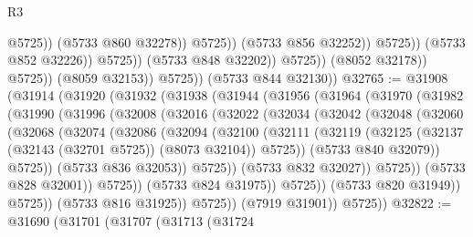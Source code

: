 \begin{lexlean}{R3}
\begin{coremodule}
                                              @5725))
                                          (@5733 @860 @32278))
                                        @5725))
                                    (@5733 @856 @32252))
                                  @5725))
                              (@5733 @852 @32226))
                            @5725))
                        (@5733 @848 @32202))
                      @5725))
                  (@8052 @32178))
                @5725))
            (@8059 @32153))
          @5725))
      (@5733 @844 @32130))
@32765 := @31908
    (@31914
      (@31920
        (@31932
          (@31938
            (@31944
              (@31956
                (@31964
                  (@31970
                    (@31982
                      (@31990
                        (@31996
                          (@32008
                            (@32016
                              (@32022
                                (@32034
                                  (@32042
                                    (@32048
                                      (@32060
                                        (@32068
                                          (@32074
                                            (@32086
                                              (@32094
                                                (@32100
                                                  (@32111
                                                    (@32119
                                                      (@32125
                                                        (@32137
                                                          (@32143 (@32701 @5725))
                                                          (@8073 @32104))
                                                        @5725))
                                                    (@5733 @840 @32079))
                                                  @5725))
                                              (@5733 @836 @32053))
                                            @5725))
                                        (@5733 @832 @32027))
                                      @5725))
                                  (@5733 @828 @32001))
                                @5725))
                            (@5733 @824 @31975))
                          @5725))
                      (@5733 @820 @31949))
                    @5725))
                (@5733 @816 @31925))
              @5725))
          (@7919 @31901))
        @5725))
@32822 := @31690
    (@31701
      (@31707
        (@31713
          (@31724

\end{coremodule}
\end{lexlean}
